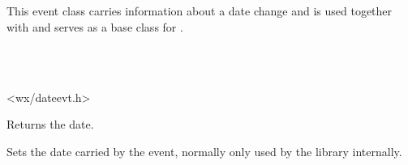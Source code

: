 
\section{}\label{wxdateevent}

This event class carries information about a date change and is used together
with  and serves as a base class
for .


\\
\\


<wx/dateevt.h>



\label{wxdateeventgetdate}


Returns the date.


\label{wxdateeventsetdate}


Sets the date carried by the event, normally only used by the library
internally.


